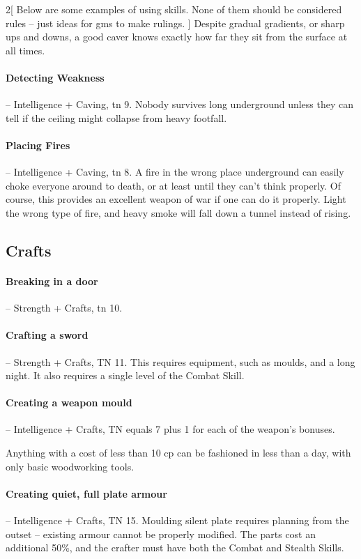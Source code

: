 \begin{multicols}{2}[
  Below are some examples of using skills.
  None of them should be considered rules -- just ideas for \glspl{gm} to make rulings.
]
Despite gradual gradients, or sharp ups and downs, a good caver knows exactly how far they sit from the surface at all times.

\paragraph{Detecting Weakness} -- Intelligence + Caving, \gls{tn} 9.
Nobody survives long underground unless they can tell if the ceiling might collapse from heavy footfall.

\paragraph{Placing Fires} -- Intelligence + Caving, \gls{tn} 8.
A fire in the wrong place underground can easily choke everyone around to death, or at least until they can't think properly.
Of course, this provides an excellent weapon of war if one can do it properly.
Light the wrong type of fire, and heavy smoke will fall down a tunnel instead of rising.

\subsection{Crafts}

\paragraph{Breaking in a door} -- Strength + Crafts, \gls{tn} 10.

\paragraph{Crafting a sword} -- Strength + Crafts, TN 11.
This requires equipment, such as moulds, and a long night.
It also requires a single level of the Combat Skill.

\paragraph{Creating a weapon mould} -- Intelligence + Crafts, TN equals 7 plus 1 for each of the weapon's bonuses.

Anything with a cost of less than 10 \gls{cp} can be fashioned in less than a day, with only basic woodworking tools.

\paragraph{Creating quiet, full plate armour} -- Intelligence + Crafts, TN 15.
Moulding silent plate requires planning from the outset -- existing armour cannot be properly modified.
The parts cost an additional 50\%, and the crafter must have both the Combat and Stealth Skills.


\end{multicols}
